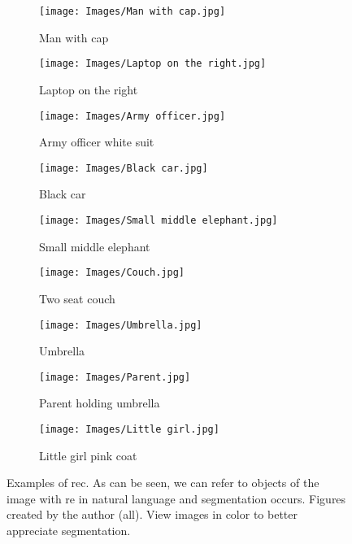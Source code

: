 \begin{figure}[p]
  \centering
  \begin{subfigure}[t]{.32\textwidth}
    \centering
    \caption{Man with cap}\label{fig:rec-man}
    \texttt{[image: Images/Man with cap.jpg]}
  \end{subfigure}\hfill
  \begin{subfigure}[t]{.32\textwidth}
    \centering
    \caption{Laptop on the right}\label{fig:rec-laptop}
    \texttt{[image: Images/Laptop on the right.jpg]}
  \end{subfigure}\hfill
  \begin{subfigure}[t]{.32\textwidth}
    \centering
    \caption{Army officer white suit}\label{fig:rec-army}
    \texttt{[image: Images/Army officer.jpg]}
  \end{subfigure}

  \bigskip
  \begin{subfigure}[t]{.32\textwidth}
    \centering
    \caption{Black car}\label{fig:rec-car}
    \texttt{[image: Images/Black car.jpg]}
  \end{subfigure}\hfill
  \begin{subfigure}[t]{.32\textwidth}
    \centering
    \caption{Small middle elephant}\label{fig:rec-elephant}
    \texttt{[image: Images/Small middle elephant.jpg]}
  \end{subfigure}\hfill
  \begin{subfigure}[t]{.32\textwidth}
    \centering
    \caption{Two seat couch}\label{fig:rec-couch}
    \texttt{[image: Images/Couch.jpg]}
  \end{subfigure}

  \bigskip
  \begin{subfigure}[t]{.32\textwidth}
    \centering
    \caption{Umbrella}\label{fig:rec-umbrella}
    \texttt{[image: Images/Umbrella.jpg]}
  \end{subfigure}\hfill
  \begin{subfigure}[t]{.32\textwidth}
    \centering
    \caption{Parent holding umbrella}\label{fig:rec-parent}
    \texttt{[image: Images/Parent.jpg]}
  \end{subfigure}\hfill
  \begin{subfigure}[t]{.32\textwidth}
    \centering
    \caption{Little girl pink coat}\label{fig:rec-girl}
    \texttt{[image: Images/Little girl.jpg]}
  \end{subfigure}
  \caption[Examples of ]{Examples of \acl{rec}. As can be
    seen, we can refer to objects of the image with \gls{re} in natural
    language and segmentation occurs. Figures created by the author (all). View
    images in color to better appreciate segmentation.}%
  \label{fig:rec-examples}
\end{figure}



